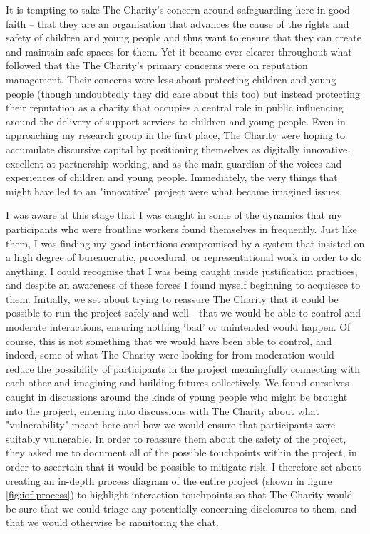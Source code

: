 It is tempting to take The Charity’s concern around safeguarding here in good faith – that they are an organisation that advances the cause of the rights and safety of children and young people and thus want to ensure that they can create and maintain safe spaces for them. Yet it became ever clearer throughout what followed that the The Charity's primary concerns were on reputation management. Their concerns were less about protecting children and young people (though undoubtedly they did care about this too) but instead protecting their reputation as a charity that occupies a central role in public influencing around the delivery of support services to children and young people. Even in approaching my research group in the first place, The Charity were hoping to accumulate discursive capital by positioning themselves as digitally innovative, excellent at partnership-working, and as the main guardian of the voices and experiences of children and young people. Immediately, the very things that might have led to an "innovative" project were what became imagined issues.

I was aware at this stage that I was caught in some of the dynamics that my participants who were frontline workers found themselves in frequently. Just like them, I was finding my good intentions compromised by a system that insisted on a high degree of bureaucratic, procedural, or representational work in order to do anything. I could recognise that I was being caught inside justification practices, and despite an awareness of these forces I found myself beginning to acquiesce to them. Initially, we set about trying to reassure The Charity that it could be possible to run the project safely and well—that we would be able to control and moderate interactions, ensuring nothing ‘bad’ or unintended would happen. Of course, this is not something that we would have been able to control, and indeed, some of what The Charity were looking for from moderation would reduce the possibility of participants in the project meaningfully connecting with each other and imagining and building futures collectively. We found ourselves caught in discussions around the kinds of young people who might be brought into the project, entering into discussions with The Charity about what "vulnerability" meant here and how we would ensure that participants were suitably vulnerable. In order to reassure them about the safety of the project, they asked me to document all of the possible touchpoints within the project, in order to ascertain that it would be possible to mitigate risk. I therefore set about creating an in-depth process diagram of the entire project (shown in figure \ref{fig:iof-process}) to highlight interaction touchpoints so that The Charity would be sure that we could triage any potentially concerning disclosures to them, and that we would otherwise be monitoring the chat. 

